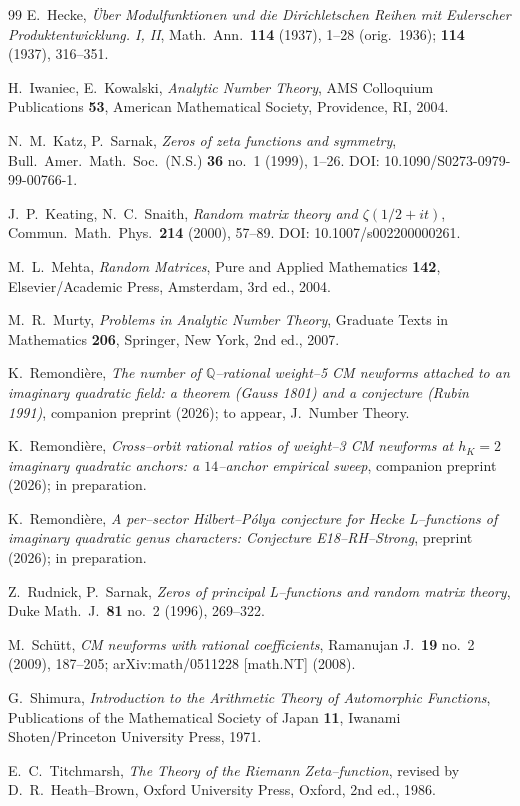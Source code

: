 \documentclass[11pt]{amsart}
\theoremstyle{definition}
\theoremstyle{remark}
\newcommand{\Q}{\mathbb{Q}}
\begin{document}
\begin{thebibliography}{99}
E.\ Hecke,
\textit{\"Uber Modulfunktionen und die Dirichletschen Reihen mit
Eulerscher Produktentwicklung. I, II},
Math.\ Ann.\ \textbf{114} (1937), 1--28 (orig.\ 1936);
\textbf{114} (1937), 316--351.

H.\ Iwaniec, E.\ Kowalski,
\textit{Analytic Number Theory},
AMS Colloquium Publications \textbf{53}, American Mathematical Society,
Providence, RI, 2004.

N.~M.\ Katz, P.\ Sarnak,
\textit{Zeros of zeta functions and symmetry},
Bull.\ Amer.\ Math.\ Soc.\ (N.S.) \textbf{36} no.~1 (1999), 1--26.
DOI: 10.1090/S0273-0979-99-00766-1.

J.~P.\ Keating, N.~C.\ Snaith,
\textit{Random matrix theory and \(\zeta(1/2 + it)\)},
Commun.\ Math.\ Phys.\ \textbf{214} (2000), 57--89.
DOI: 10.1007/s002200000261.

M.~L.\ Mehta,
\textit{Random Matrices},
Pure and Applied Mathematics \textbf{142}, Elsevier/Academic Press,
Amsterdam, 3rd ed., 2004.

M.~R.\ Murty,
\textit{Problems in Analytic Number Theory},
Graduate Texts in Mathematics \textbf{206}, Springer, New York,
2nd ed., 2007.

K.\ Remondi\`ere,
\textit{The number of \(\Q\)--rational weight--5 CM newforms attached
to an imaginary quadratic field: a theorem (Gauss 1801) and a
conjecture (Rubin 1991)},
companion preprint (2026); to appear, J.\ Number Theory.

K.\ Remondi\`ere,
\textit{Cross--orbit rational ratios of weight--3 CM newforms at
\(h_K = 2\) imaginary quadratic anchors: a \(14\)--anchor empirical
sweep},
companion preprint (2026); in preparation.

K.\ Remondi\`ere,
\textit{A per--sector Hilbert--P\'olya conjecture for Hecke
L--functions of imaginary quadratic genus characters: Conjecture
E18--RH--Strong},
preprint (2026); in preparation.

Z.\ Rudnick, P.\ Sarnak,
\textit{Zeros of principal L--functions and random matrix theory},
Duke Math.\ J.\ \textbf{81} no.~2 (1996), 269--322.

M.\ Sch\"utt,
\textit{CM newforms with rational coefficients},
Ramanujan J.\ \textbf{19} no.~2 (2009), 187--205;
arXiv:math/0511228 [math.NT] (2008).

G.\ Shimura,
\textit{Introduction to the Arithmetic Theory of Automorphic
Functions},
Publications of the Mathematical Society of Japan \textbf{11},
Iwanami Shoten/Princeton University Press, 1971.

E.~C.\ Titchmarsh,
\textit{The Theory of the Riemann Zeta--function},
revised by D.~R.\ Heath--Brown, Oxford University Press, Oxford,
2nd ed., 1986.

\end{thebibliography}
\end{document}
